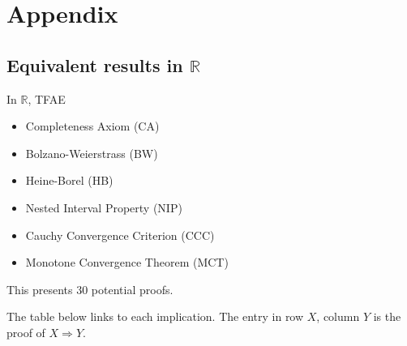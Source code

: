 \newpage
\section{Appendix}

\subsection{Equivalent results in $\mathbb{R}$}\label{sec:equiv-R}

\begin{remark}
    In $\mathbb{R}$, TFAE 
    \begin{itemize}
        \item Completeness Axiom (CA)
        \item Bolzano-Weierstrass (BW)
        \item Heine-Borel (HB)
        \item Nested Interval Property (NIP)
        \item Cauchy Convergence Criterion (CCC)
        \item Monotone Convergence Theorem (MCT)
    \end{itemize}
    This presents 30 potential proofs.
\end{remark}

The table below links to each implication. The entry in row $X$, column $Y$ is the proof of $X \Rightarrow Y$.

